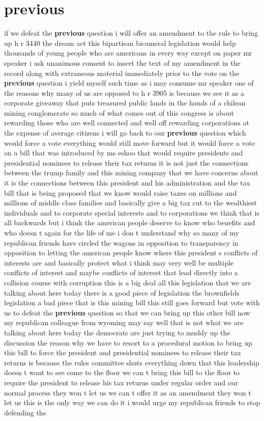 \documentclass{article}
\begin{document}
\section*{previous}
if we defeat the {\bf \color{red} previous} question i will offer an amendment to the rule to bring up h r 3440 the dream act this bipartisan bicameral legislation would help thousands of young people who are americans in every way except on paper mr speaker i ask unanimous consent to insert the text of my amendment in the record along with extraneous material immediately prior to the vote on the {\bf \color{red} previous} question
\vspace{8mm}
i yield myself such time as i may consume mr speaker one of the reasons why many of us are opposed to h r 3905 is because we see it as a corporate giveaway that puts treasured public lands in the hands of a chilean mining conglomerate so much of what comes out of this congress is about rewarding those who are well connected and well off rewarding corporations at the expense of average citizens i will go back to our {\bf \color{red} previous} question which would force a vote everything would still move forward but it would force a vote on a bill that was introduced by ms eshoo that would require presidents and presidential nominees to release their tax returns it is not just the connections between the trump family and this mining company that we have concerns about it is the connections between this president and his administration and the tax bill that is being proposed that we know would raise taxes on millions and millions of middle class families and basically give a big tax cut to the wealthiest individuals and to corporate special interests and to corporations we think that is all backwards but i think the american people deserve to know who benefits and who doesn t again for the life of me i don t understand why so many of my republican friends have circled the wagons in opposition to transparency in opposition to letting the american people know where this president s conflicts of interests are and basically protect what i think may very well be multiple conflicts of interest and maybe conflicts of interest that lead directly into a collision course with corruption this is a big deal all this legislation that we are talking about here today there is a good piece of legislation the brownfields legislation a bad piece that is this mining bill this still goes forward but vote with us to defeat the {\bf \color{red} previous} question so that we can bring up this other bill now my republican colleague from wyoming may say well that is not what we are talking about here today the democrats are just trying to muddy up the discussion the reason why we have to resort to a procedural motion to bring up this bill to force the president and presidential nominees to release their tax returns is because the rules committee shuts everything down that this leadership doesn t want to see come to the floor we can t bring this bill to the floor to require the president to release his tax returns under regular order and our normal process they won t let us we can t offer it as an amendment they won t let us this is the only way we can do it i would urge my republican friends to stop defending the 
\end{document}
